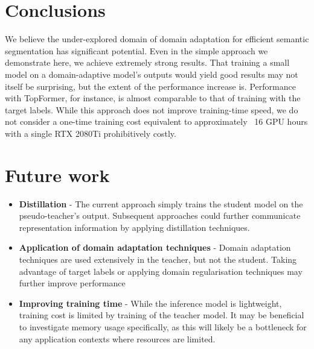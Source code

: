 \documentclass[a4paper,12pt]{report}
\begin{document}
\section{Conclusions}
We believe the under-explored domain of domain adaptation for efficient semantic segmentation has significant potential. Even in the simple approach we demonstrate here, we achieve extremely strong results. That training a small model on a domain-adaptive model's outputs would yield good results may not itself be surprising, but the extent of the performance increase is. Performance with TopFormer, for instance, is almost comparable to that of training with the target labels.
While this approach does not improve training-time speed, we do not consider a one-time training cost equivalent to approximately ~16 GPU hours with a single RTX 2080Ti prohibitively costly.

\section{Future work}
\begin{itemize}
    \item \textbf{Distillation} - The current approach simply trains the student model on the pseudo-teacher's output. Subsequent approaches could further communicate representation information by applying distillation techniques.
    \item \textbf{Application of domain adaptation techniques} - Domain adaptation techniques are used extensively in the teacher, but not the student. Taking advantage of target labels or applying domain regularisation techniques may further improve performance
    \item \textbf{Improving training time} - While the inference model is lightweight, training cost is limited by training of the teacher model. It may be beneficial to investigate memory usage specifically, as this will likely be a bottleneck for any application contexts where resources are limited.
\end{itemize}

\FloatBarrier

\end{document}
